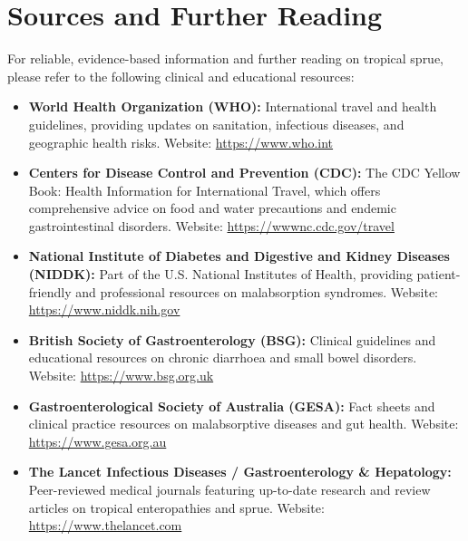 \section*{Sources and Further Reading}
For reliable, evidence-based information and further reading on tropical sprue, please refer to the following clinical and educational resources:
\begin{itemize}
    \item \textbf{World Health Organization (WHO):} International travel and health guidelines, providing updates on sanitation, infectious diseases, and geographic health risks. Website: \url{https://www.who.int}
    \item \textbf{Centers for Disease Control and Prevention (CDC):} The CDC Yellow Book: Health Information for International Travel, which offers comprehensive advice on food and water precautions and endemic gastrointestinal disorders. Website: \url{https://wwwnc.cdc.gov/travel}
    \item \textbf{National Institute of Diabetes and Digestive and Kidney Diseases (NIDDK):} Part of the U.S. National Institutes of Health, providing patient-friendly and professional resources on malabsorption syndromes. Website: \url{https://www.niddk.nih.gov}
    \item \textbf{British Society of Gastroenterology (BSG):} Clinical guidelines and educational resources on chronic diarrhoea and small bowel disorders. Website: \url{https://www.bsg.org.uk}
    \item \textbf{Gastroenterological Society of Australia (GESA):} Fact sheets and clinical practice resources on malabsorptive diseases and gut health. Website: \url{https://www.gesa.org.au}
    \item \textbf{The Lancet Infectious Diseases / Gastroenterology \& Hepatology:} Peer-reviewed medical journals featuring up-to-date research and review articles on tropical enteropathies and sprue. Website: \url{https://www.thelancet.com}
\end{itemize}